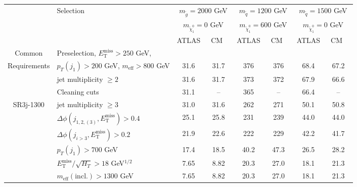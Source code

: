 \documentclass[10pt,fleqn]{article}
\newcommand{\met}{E^\mathrm{miss}_\mathrm{T}}
\newcommand{\meff}{m_\mathrm{eff}}
\begin{document}
\begin{table}[h!] 
 \renewcommand*{\arraystretch}{1.}
 \begin{tabular}{c|l|c|c|c|c|c|c} \toprule
      & Selection & \multicolumn{2}{c|}{$m_{\tilde{g}} = 2000$ GeV}      & \multicolumn{2}{c|}{$m_{\tilde{q}} = 1200$ GeV}         & \multicolumn{2}{c}{$m_{\tilde{q}} = 1500$ GeV}         \\ 
      &           & \multicolumn{2}{c|}{$m_{\tilde{\chi}^0_1} = 0$ GeV}  & \multicolumn{2}{c|}{$m_{\tilde{\chi}^0_1} = 600$ GeV}   & \multicolumn{2}{c}{$m_{\tilde{\chi}^0_1} = 0$ GeV}     \\ \midrule
      &           & ATLAS             &  ~CM~~                           & ATLAS             & ~CM~~                            & ATLAS             & ~CM~~                            \\ \midrule
Common& Preselection, $\met > 250$ GeV,&          &   &   &  & & \\ 
Requirements & $p_T(j_1) > 200$ GeV, $\meff > 800$ GeV         &     31.6   &   31.7    &  376       &   376     &      68.4    &   67.2         \\
             & jet multiplicity $\geq 2$                       &     31.6   &   31.7    &  373       &   372     &      67.9    &   66.6         \\
             & Cleaning cuts                                   &     31.1   &   --      &  365       &   --      &      66.4    &   --          \\ \midrule
SR3j-1300    & jet multiplicity $\geq 3$                       &     31.0   &   31.6    &  262       &   271     &      50.1    &   50.8         \\
             & $\Delta\phi(j_{1,2,(3)},\met) > 0.4$            &     25.1   &   25.8    &  231       &   239     &      44.0    &   44.0         \\
             & $\Delta\phi(j_{i>3},\met) > 0.2$                &     21.9   &   22.6    &  222       &   229     &      42.2    &   41.7         \\
             & $p_T(j_1) > 700$ GeV                            &     17.4   &   18.5    &  40.2      &   47.3    &      26.5    &   28.2         \\                       
             & $\met/\sqrt{H_T} > 18$ GeV$^{1/2}$              &     7.65   &   8.82    &  20.3      &   27.0    &      18.1    &   21.3         \\    
             & $\meff(\mathrm{incl.}) > 1300$ GeV              &     7.65   &   8.82    &  20.3      &   27.0    &      18.1    &   21.3         \\ \midrule    

\end{tabular}
\end{table}
\end{document}

